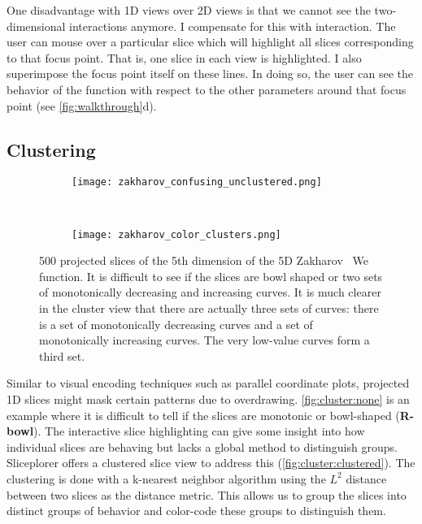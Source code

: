One disadvantage with 1D views over 2D views is that we cannot see the
two-dimensional interactions anymore. I compensate for this with
interaction. %
The user can mouse over a particular slice which will highlight
all slices corresponding to that focus point. That is, one slice in each view is highlighted.
I also superimpose the focus point itself on these lines. In doing so,
the user can see the behavior of the function with respect to the other
parameters around that focus point (see \autoref{fig:walkthrough}d).

\subsection{Clustering}

\begin{figure}
  \centering
  \begin{subfigure}[b]{0.48\columnwidth}
    \texttt{[image: zakharov\_confusing\_unclustered.png]}
    \caption{
    }
    \label{fig:cluster:none}
  \end{subfigure}
  ~
  \begin{subfigure}[b]{0.48\columnwidth}
    \texttt{[image: zakharov\_color\_clusters.png]}
    \caption{
    }
    \label{fig:cluster:clustered}
  \end{subfigure}
  \caption{
    500 projected slices of the 5th dimension of the 5D Zakharov~\cite{Back:1996} 
We    function. It is difficult to see if the slices are bowl shaped or two sets
    of monotonically decreasing and increasing curves. It is much clearer in 
    the cluster view that there are actually three sets of curves: 
    there is a set of monotonically decreasing curves and a set of 
    monotonically increasing curves. The very low-value curves form a third
    set.
  }
\end{figure}

Similar to visual encoding techniques such as parallel coordinate plots, projected 1D slices might mask certain patterns due to
overdrawing.
\autoref{fig:cluster:none} is an example where it is difficult to tell if the
slices are monotonic or bowl-shaped (\textbf{R-bowl}). The interactive slice highlighting
can give some insight into how individual slices are behaving but lacks
a global method to distinguish groups. Sliceplorer offers a
clustered slice view to address this (\autoref{fig:cluster:clustered}). 
The clustering is done with a k-nearest neighbor algorithm using the
$L^2$ distance between two slices as the distance metric.
This allows us to group the slices into distinct
groups of behavior and color-code these groups to distinguish them.


